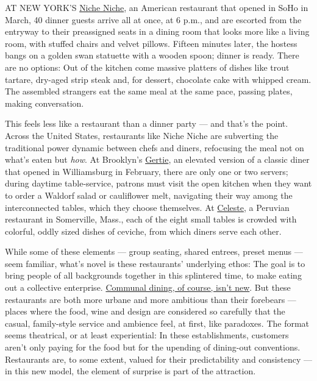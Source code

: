AT NEW YORK'S \href{https://www.nichenichenyc.com/}{Niche Niche}, an
American restaurant that opened in SoHo in March, 40 dinner guests
arrive all at once, at 6 p.m., and are escorted from the entryway to
their preassigned seats in a dining room that looks more like a living
room, with stuffed chairs and velvet pillows. Fifteen minutes later, the
hostess bangs on a golden swan statuette with a wooden spoon; dinner is
ready. There are no options: Out of the kitchen come massive platters of
dishes like trout tartare, dry-aged strip steak and, for dessert,
chocolate cake with whipped cream. The assembled strangers eat the same
meal at the same pace, passing plates, making conversation.

This feels less like a restaurant than a dinner party --- and that's the
point. Across the United States, restaurants like Niche Niche are
subverting the traditional power dynamic between chefs and diners,
refocusing the meal not on what's eaten but \emph{how}. At Brooklyn's
\href{https://www.gertie.nyc/}{Gertie}, an elevated version of a classic
diner that opened in Williamsburg in February, there are only one or two
servers; during daytime table-service, patrons must visit the open
kitchen when they want to order a Waldorf salad or cauliflower melt,
navigating their way among the interconnected tables, which they choose
themselves. At \href{https://celesteunionsquare.com/}{Celeste}, a
Peruvian restaurant in Somerville, Mass., each of the eight small tables
is crowded with colorful, oddly sized dishes of ceviche, from which
diners serve each other.

While some of these elements --- group seating, shared entrees, preset
menus --- seem familiar, what's novel is these restaurants' underlying
ethos: The goal is to bring people of all backgrounds together in this
splintered time, to make eating out a collective enterprise.
\href{https://www.nytimes3xbfgragh.onion/2019/05/16/t-magazine/the-end-of-sharing-food.html}{Communal
dining, of course, isn't new}. But these restaurants are both more
urbane and more ambitious than their forebears --- places where the
food, wine and design are considered so carefully that the casual,
family-style service and ambience feel, at first, like paradoxes. The
format seems theatrical, or at least experiential: In these
establishments, customers aren't only paying for the food but for the
upending of dining-out conventions. Restaurants are, to some extent,
valued for their predictability and consistency --- in this new model,
the element of surprise is part of the attraction.

